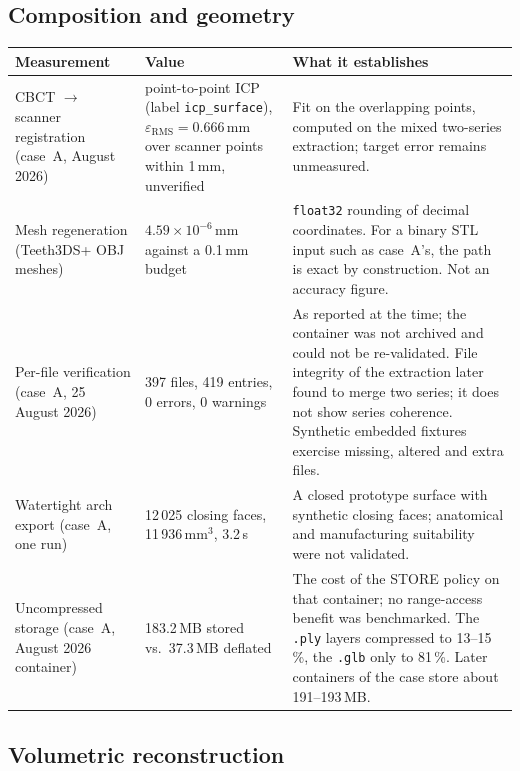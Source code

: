 \documentclass[11pt,a4paper]{article}
\newcommand{\code}[1]{\texttt{\small #1}}
\begin{document}
\subsection{Composition and geometry}

\begin{longtable}{L{5.6cm} L{4.0cm} L{5.6cm}}
\toprule
\textbf{Measurement} & \textbf{Value} & \textbf{What it establishes}\\
\midrule
\endhead
CBCT $\to$ scanner registration (case~A, August 2026) & point-to-point ICP (label
\code{icp\_surface}), $\varepsilon_{\mathrm{RMS}} = 0.666$\,mm over scanner points within
1\,mm, unverified & Fit on the overlapping points, computed on the mixed two-series
extraction; target error remains unmeasured.\\

Mesh regeneration (Teeth3DS+ OBJ meshes) & $4.59\times10^{-6}$\,mm against a 0.1\,mm
budget & \code{float32} rounding of decimal coordinates. For a binary STL input such as
case~A's, the path is exact by construction. Not an accuracy figure.\\

Per-file verification (case~A, 25 August 2026) & 397 files, 419 entries, 0 errors, 0 warnings &
As reported at the time; the container was not archived and could not be re-validated. File
integrity of the extraction later found to merge two series; it does not show series
coherence. Synthetic embedded fixtures exercise missing, altered and extra files.\\

Watertight arch export (case~A, one run) & 12\,025 closing faces, 11\,936\,mm$^3$, 3.2\,s &
A closed prototype surface with synthetic closing faces; anatomical and manufacturing
suitability were not validated.\\

Uncompressed storage (case~A, August 2026 container) & 183.2\,MB stored vs.\ 37.3\,MB
deflated & The cost of the STORE policy on that container; no range-access benefit was
benchmarked. The \code{.ply} layers compressed to 13--15\,\%, the \code{.glb} only to
81\,\%. Later containers of the case store about 191--193\,MB.\\
\bottomrule
\end{longtable}

\subsection{Volumetric reconstruction}
\end{document}
